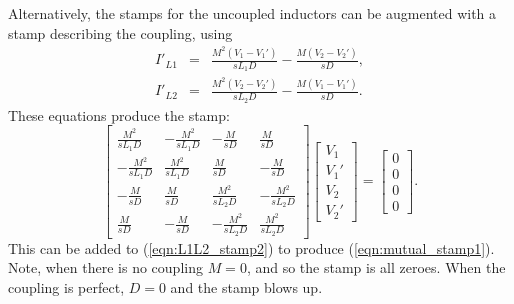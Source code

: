 \documentclass[a4paper, 12pt]{article}
\newcommand{\encp}[1]{\left(#1\right)}
\newcommand{\refeqn}[1]{\mbox{(\ref{eqn:#1})}}
\begin{document}
Alternatively, the stamps for the uncoupled inductors can be augmented
with a stamp describing the coupling, using
%
\begin{eqnarray}
  I'_{L1} & = & \frac{M^2\encp{V_1 - V_1'}}{sL_1 D} - \frac{M\encp{V_2 - V_2'}}{sD}, \\
  I'_{L2} & = & \frac{M^2\encp{V_2 - V_2'}}{sL_2 D} - \frac{M\encp{V_1 - V_1'}}{sD}.
\end{eqnarray}
%
These equations produce the stamp:
%
\begin{equation}
  \begin{bmatrix}
    \frac{M^2}{sL_1 D} & -\frac{M^2}{sL_1 D} & -\frac{M}{sD}  & \frac{M}{sD} \\
   -\frac{M^2}{sL_1 D} & \frac{M^2}{sL_1 D}  & \frac{M}{sD}  & -\frac{M}{sD} \\
  -\frac{M}{sD} & \frac{M}{sD} &  \frac{M^2}{sL_2 D} & -\frac{M^2}{sL_2 D}   \\
   \frac{M}{sD} & -\frac{M}{sD} & -\frac{M^2}{sL_2 D} & \frac{M^2}{sL_2 D}
  \end{bmatrix}
  \begin{bmatrix}
    V_1 \\ V_1' \\ V_2 \\ V_2'
  \end{bmatrix}
=
\begin{bmatrix}
0 \\ 0 \\ 0 \\ 0
\end{bmatrix}.
\end{equation}
%
This can be added to \refeqn{L1L2_stamp2} to produce
\refeqn{mutual_stamp1}.  Note, when there is no coupling $M=0$, and so
the stamp is all zeroes.  When the coupling is perfect, $D=0$ and the
stamp blows up.
\end{document}
